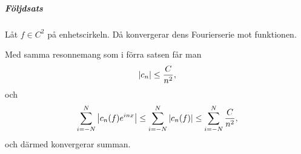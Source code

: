 \subparagraph{Följdsats}
Låt $f\in C^{2}$ på enhetscirkeln. Då konvergerar dens Fourierserie mot funktionen.

\proof
Med samma resonnemang som i förra satsen får man
\begin{align*}
	\abs{c_{n}} \leq \frac{C}{n^{2}},
\end{align*}
och
\begin{align*}
	\sum\limits_{i = -N}^{N}\abs{c_{n}(f)e^{inx}} \leq \sum\limits_{i = -N}^{N}\abs{c_{n}(f)} \leq \sum\limits_{i = -N}^{N}\frac{C}{n^{2}},
\end{align*}
och därmed konvergerar summan.